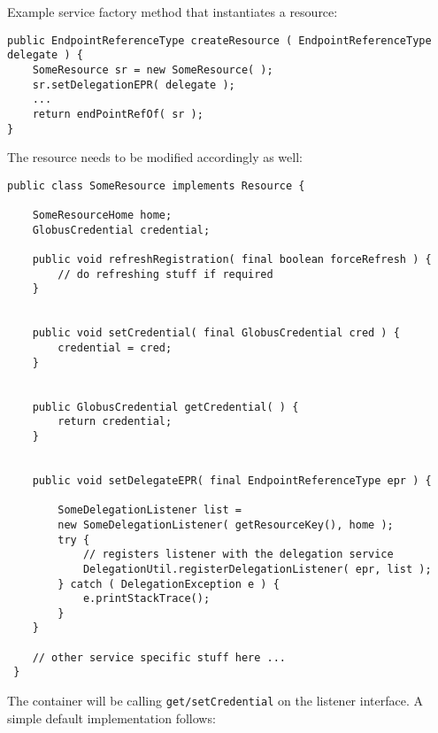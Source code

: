 \documentclass{article}
\begin{document}
Example service factory method that instantiates a resource:

\begin{verbatim}
public EndpointReferenceType createResource ( EndpointReferenceType delegate ) {
    SomeResource sr = new SomeResource( );
    sr.setDelegationEPR( delegate );
    ...
    return endPointRefOf( sr );
}
\end{verbatim}

The resource needs to be modified accordingly as well:


\begin{verbatim}
public class SomeResource implements Resource {

    SomeResourceHome home;
    GlobusCredential credential;

    public void refreshRegistration( final boolean forceRefresh ) {
        // do refreshing stuff if required
    }


    public void setCredential( final GlobusCredential cred ) {
        credential = cred;
    }


    public GlobusCredential getCredential( ) {
        return credential;
    }


    public void setDelegateEPR( final EndpointReferenceType epr ) {

        SomeDelegationListener list = 
        new SomeDelegationListener( getResourceKey(), home );
        try {
            // registers listener with the delegation service
            DelegationUtil.registerDelegationListener( epr, list );
        } catch ( DelegationException e ) {
            e.printStackTrace();
        }
    }

    // other service specific stuff here ...
 }
\end{verbatim}

The container will be calling \verb!get/setCredential! on the
listener interface. A simple default implementation follows:
\end{document}
